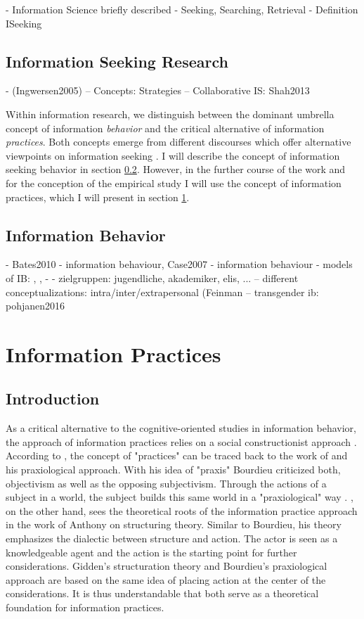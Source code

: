 \documentclass[12pt, a4paper, titlepage, oneside, abstract=true, toc=listof, toc=bibliography]{scrreprt}
\begin{document}
- Information Science briefly described
- Seeking, Searching, Retrieval
- Definition ISeeking

\subsection{Information Seeking Research}

-  (Ingwersen2005)
-- Concepts: Strategies
-- Collaborative IS: Shah2013 

Within information research, we distinguish between the dominant umbrella concept of information \textit{behavior} and the critical alternative of information \textit{practices}. Both concepts emerge from different discourses which offer alternative viewpoints on information seeking \citep{Savolainen2007}. I will describe the concept of information seeking behavior in section \ref{sec:ISB}. However, in the further course of the work and for the conception of the empirical study I will use the concept of information practices, which I will present in section \ref{sec:IP}. 
	
\subsection{Information Behavior}
\label{sec:ISB}
- Bates2010 - information behaviour, Case2007 - information behaviour
- models of IB: \citep{Wilson1994} \citep{Ellis1993}, \citep{Kuhlthau1991}, \citep{Niedzwiedzka2003}
- \citep{Fisher2009}
- zielgruppen: jugendliche, akademiker, elis, ...
-- different conceptualizations: intra/inter/extrapersonal (Feinman
-- transgender ib: pohjanen2016

\section{Information Practices}
\label{sec:IP}
\subsection{Introduction}
As a critical alternative to the cognitive-oriented studies in information behavior, the approach of information practices relies on a social constructionist approach \citep{Savolainen2007}. According to \citep[p. 102]{Araujo2019}, the concept of "practices" can be traced back to the work of \citet{Bourdieu1994} and his praxiological approach. With his idea of "praxis" Bourdieu criticized both, objectivism as well as the opposing subjectivism. Through the actions of a subject in a world, the subject builds this same world in a "praxiological" way \citep[p. 102]{Araujo2019}. \citep[p. 120]{Savolainen2007}, on the other hand, sees the theoretical roots of the information practice approach in the work of Anthony \citet{Giddens1984} on structuring theory. Similar to Bourdieu, his theory emphasizes the dialectic between structure and action. The actor is seen as a knowledgeable agent and the action is the starting point for further considerations. Gidden's structuration theory and Bourdieu's praxiological approach are based on the same idea of placing action at the center of the considerations. It is thus understandable that both serve as a theoretical foundation for information practices. 
\end{document}

